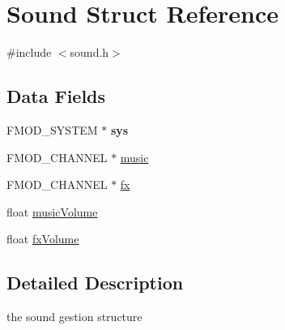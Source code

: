 \hypertarget{struct_sound}{\section{Sound Struct Reference}
\label{struct_sound}
}


{\ttfamily \#include $<$sound.\-h$>$}

\subsection*{Data Fields}
\begin{DoxyCompactItemize}
\item 
\hypertarget{struct_sound_ae043bb23ee313709e1c605dd6c06d317}{F\-M\-O\-D\-\_\-\-S\-Y\-S\-T\-E\-M $\ast$ {\bfseries sys}}\label{struct_sound_ae043bb23ee313709e1c605dd6c06d317}

\item 
F\-M\-O\-D\-\_\-\-C\-H\-A\-N\-N\-E\-L $\ast$ \hyperlink{struct_sound_acca26c408c6140c8cdc0d8f49d31ad4a}{music}
\item 
F\-M\-O\-D\-\_\-\-C\-H\-A\-N\-N\-E\-L $\ast$ \hyperlink{struct_sound_a259d72174e26b5bb58146484cd54c1c8}{fx}
\item 
float \hyperlink{struct_sound_a6f06b572245c72c79f052b7efb89dc3b}{music\-Volume}
\item 
float \hyperlink{struct_sound_aedb4246a8bbae1c53f2f29572674b054}{fx\-Volume}
\end{DoxyCompactItemize}


\subsection{Detailed Description}
the sound gestion structure 

